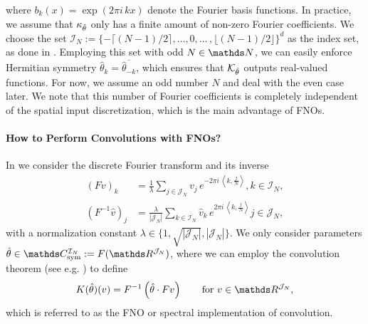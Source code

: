 %
where $b_k(x) = \exp{(2\pi i\, kx)}$ denote the Fourier basis functions. In practice, we assume that $\kappa_{\hat{\theta}}$ only has a finite amount of non-zero Fourier coefficients. We choose the set $\mathcal{I}_N := \lbrace -\lceil (N-1)/2\rceil, \ldots,0, \ldots\,, \lfloor (N-1)/2 \rfloor\rbrace^d$ as the index set, as done in \cite{li2020fourier}. Employing this set with odd $N\in\N$, we can easily enforce Hermitian symmetry $\hat{\theta}_k = \overline{\hat{\theta}_{-k}}$, which ensures that $\mathcal{K}_{\hat{\theta}}$ outputs real-valued functions. For now, we assume an odd number $N$ and deal with the even case later. We note that this number of Fourier coefficients is completely independent of the spatial input discretization, which is the main advantage of FNOs.
%
%
\paragraph{How to Perform Convolutions with FNOs?}
%
%
In \cite{kabri2023resolution} we consider the discrete Fourier transform and its inverse
%
\begin{align*}
\left(Fv\right)_k &= \frac{1}{\lambda} \sum_{j \in \mathcal{J}_N} v_j\, e^{-2\pi i \, \left\langle k, \frac{j}{N}\right\rangle},  k \in \mathcal{I}_N,\\
%
\left(F^{-1}\hat{v}\right)_j &= \frac{\lambda}{|\mathcal{J}_N|}\sum_{k \in \mathcal{I}_N} \hat{v}_k\, e^{2\pi i \, \left\langle k, \frac{j}{N}\right\rangle} j \in \mathcal{J}_N,
\end{align*}
%
with a normalization constant $\lambda \in \{1, \sqrt{|\mathcal{J}_N|}, |\mathcal{J}_N|\}$. We only consider parameters $\hat\param\in \Csym^{\mathcal{I}_N} := F(\R^{\mathcal{J}_N})$, where we can employ the convolution theorem (see e.g. \cite{grafakos}) to define
%
\begin{align}\label{eq:discfno}
K(\hat{\theta})(v) = F^{-1}\left(\hat{\theta} \cdot Fv\right) \qquad \text{for }v \in \R^{\mathcal{J}_N},
\end{align}
%
which is referred to as the FNO or spectral implementation of convolution.
%
%
